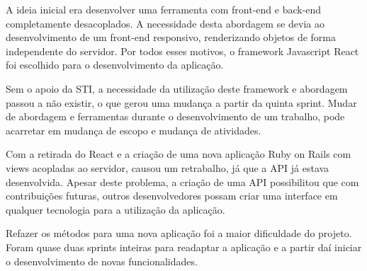 A ideia inicial era desenvolver uma ferramenta com front-end e back-end completamente desacoplados. A necessidade desta abordagem se devia ao desenvolvimento de um front-end responsivo, renderizando objetos de forma independente do servidor. Por todos esses motivos, o framework Javascript React foi escolhido para o desenvolvimento da aplicação.

Sem o apoio da STI, a necessidade da utilização deste framework e abordagem passou a não existir, o que gerou uma mudança a partir da quinta sprint. Mudar de abordagem e ferramentas durante o desenvolvimento de um trabalho, pode acarretar em mudança de escopo e mudança de atividades.

Com a retirada do React e a criação de uma nova aplicação Ruby on Rails com views acopladas ao servidor, causou um retrabalho, já que a API já estava desenvolvida. Apesar deste problema, a criação de uma API possibilitou que com contribuições futuras, outros desenvolvedores possam criar uma interface em qualquer tecnologia para a utilização da aplicação.

Refazer os métodos para uma nova aplicação foi a maior dificuldade do projeto. Foram quase duas sprints inteiras para readaptar a aplicação e a partir daí iniciar o desenvolvimento de novas funcionalidades.

